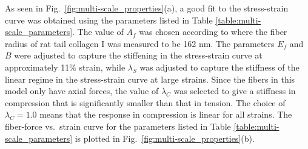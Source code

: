 \documentclass[]{interact}
\begin{document}
As seen in Fig.\ \ref{fig:multi-scale_properties}(a), a good fit to the stress-strain curve was obtained using the parameters listed in Table \ref{table:multi-scale_parameters}. The value of $A_f$ was chosen according to \citep{Dutov:2016gu} where the fiber radius of rat tail collagen I was measured to be 162 nm. The parameters $E_f$ and $B$ were adjusted to capture the stiffening in the stress-strain curve at approximately 11$\%$ strain, while $\lambda_S$ was adjusted to capture the stiffness of the linear regime in the stress-strain curve at large strains. Since the fibers in this model only have axial forces, the value of $\lambda_C$ was selected to give a stiffness in compression that is significantly smaller than that in tension. The choice of $\lambda_C = 1.0$ means that the response in compression is linear for all strains. The fiber-force vs.\ strain curve for the parameters listed in Table \ref{table:multi-scale_parameters} is plotted in Fig.\ \ref{fig:multi-scale_properties}(b).
%
\end{document}
